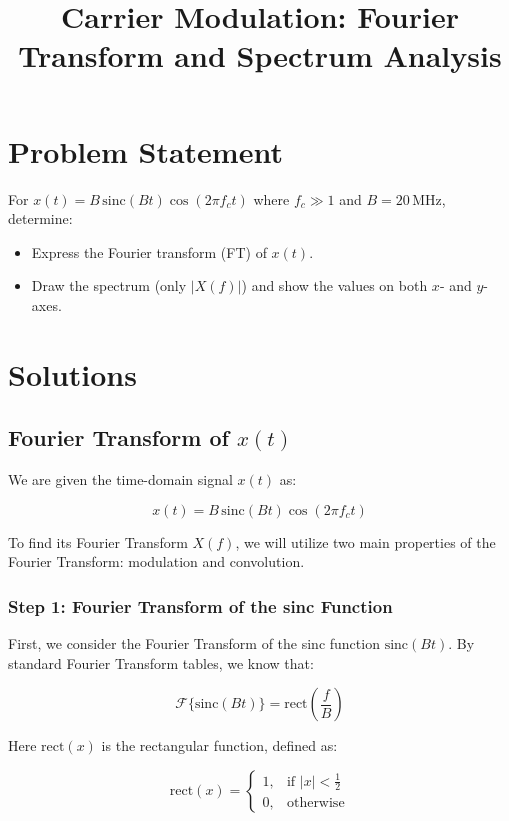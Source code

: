 \documentclass{article}
\begin{document}
\title{Carrier Modulation: Fourier Transform and Spectrum Analysis}
\author{}
\maketitle

\section*{Problem Statement}

For \( x(t) = B \, \text{sinc}(Bt) \cos(2\pi f_c t) \) where \( f_c \gg 1 \) and \( B = 20 \, \text{MHz} \), determine:

\begin{itemize}
  \item[(a)] Express the Fourier transform (FT) of \( x(t) \).
  \item[(b)] Draw the spectrum (only \( |X(f)| \)) and show the values on both \( x \)- and \( y \)-axes.
\end{itemize}

\section*{Solutions}

\subsection*{Fourier Transform of \( x(t) \)}

We are given the time-domain signal \( x(t) \) as:

\[
x(t) = B \, \text{sinc}(Bt) \cos(2\pi f_c t)
\]

To find its Fourier Transform \( X(f) \), we will utilize two main properties of the Fourier Transform: modulation and convolution.

\subsubsection*{Step 1: Fourier Transform of the sinc Function}

First, we consider the Fourier Transform of the sinc function \( \text{sinc}(Bt) \). By standard Fourier Transform tables, we know that:

\[
\mathcal{F}\{\text{sinc}(Bt)\} = \text{rect}\left(\frac{f}{B}\right)
\]

Here \( \text{rect}(x) \) is the rectangular function, defined as:

\[
\text{rect}(x) = 
\begin{cases} 
1, & \text{if } |x| < \frac{1}{2} \\
0, & \text{otherwise}
\end{cases}
\]
\end{document}
